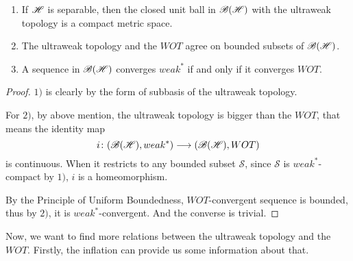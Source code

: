 \begin{prop}
	\begin{enumerate}[label = \arabic*)]
		\item If $\mathscr{H}$ is separable, then the closed unit ball in $\mathscr{B(H)}$ with the ultraweak topology is a compact metric space.
		\item The ultraweak topology and the $WOT$ agree on bounded subsets of $\mathscr{B(H)}$.
		\item A sequence in $\mathscr{B(H)}$ converges $weak^{*}$ if and only if it converges $WOT$.
	\end{enumerate}
\end{prop}
\begin{proof}
	$1)$ is clearly by the form of subbasis of the ultraweak topology. 
	\item For $2)$, by above mention, the ultraweak topology is bigger than the $WOT$, that means the identity map
	\begin{equation*}
		i \colon (\mathscr{B(H)}, weak^{*}) \longrightarrow (\mathscr{B(H)}, WOT)
	\end{equation*}
	is continuous. When it restricts to any bounded subset $\mathcal{S}$, since $\mathcal{S}$ is $weak^{*}$-compact by $1)$, $i$ is a homeomorphism.
	\item By the Principle of Uniform Boundedness, $WOT$-convergent sequence is bounded, thus by $2)$, it is $weak^{*}$-convergent. And the converse is trivial.
\end{proof}

Now, we want to find more relations between the ultraweak topology and the $WOT$. Firstly, the inflation can provide us some information about that.

